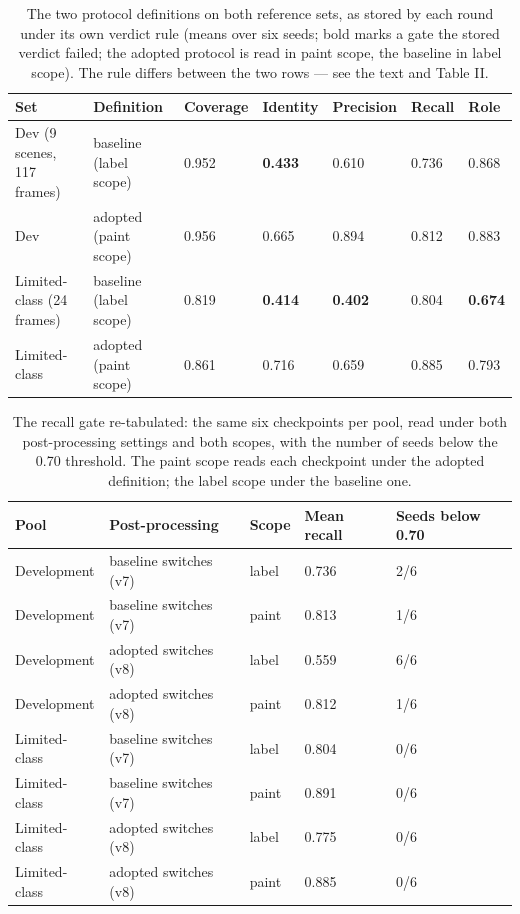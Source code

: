 \documentclass[journal]{IEEEtran}
\begin{document}
\begin{table}[!t]
\centering
\caption{The two protocol definitions on both reference sets, as stored by each round under its own
verdict rule (means over six seeds; bold marks a gate the stored verdict failed; the adopted protocol is read
in paint scope, the baseline in label scope). The rule differs between the two rows --- see the text and
Table II.}
\begin{tabular}{@{}lllllll@{}}
\toprule
Set & Definition & Coverage & Identity & Precision & Recall & Role \\
\midrule
Dev (9 scenes, 117 frames) & baseline (label scope) & 0.952 & \textbf{0.433} & 0.610 & 0.736 & 0.868 \\
Dev & adopted (paint scope) & 0.956 & 0.665 & 0.894 & 0.812 & 0.883 \\
Limited-class (24 frames) & baseline (label scope) & 0.819 & \textbf{0.414} & \textbf{0.402} & 0.804 & \textbf{0.674} \\
Limited-class & adopted (paint scope) & 0.861 & 0.716 & 0.659 & 0.885 & 0.793 \\
\bottomrule
\end{tabular}
\end{table}
\begin{table}[!t]
\centering
\caption{The recall gate re-tabulated: the same six checkpoints per pool, read under both
post-processing settings and both scopes, with the number of seeds below the 0.70 threshold. The paint scope
reads each checkpoint under the adopted definition; the label scope under the baseline one.}
\begin{tabular}{@{}lllll@{}}
\toprule
Pool & Post-processing & Scope & Mean recall & Seeds below 0.70 \\
\midrule
Development & baseline switches (v7) & label & 0.736 & 2/6 \\
Development & baseline switches (v7) & paint & 0.813 & 1/6 \\
Development & adopted switches (v8) & label & 0.559 & 6/6 \\
Development & adopted switches (v8) & paint & 0.812 & 1/6 \\
Limited-class & baseline switches (v7) & label & 0.804 & 0/6 \\
Limited-class & baseline switches (v7) & paint & 0.891 & 0/6 \\
Limited-class & adopted switches (v8) & label & 0.775 & 0/6 \\
Limited-class & adopted switches (v8) & paint & 0.885 & 0/6 \\
\bottomrule
\end{tabular}
\end{table}
\end{document}

